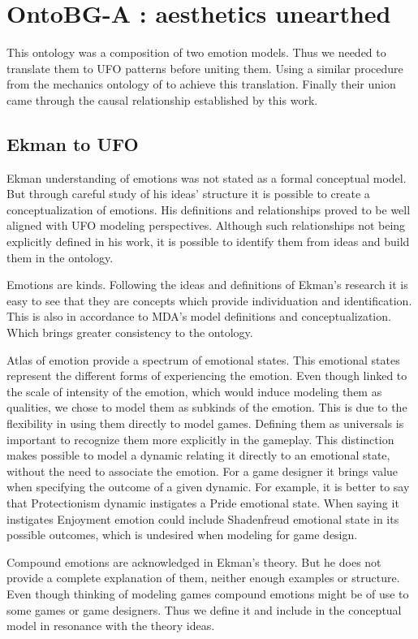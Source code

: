 \section{OntoBG-A : aesthetics unearthed}

This ontology was a composition of two emotion models. Thus we needed to translate them to UFO patterns before uniting them. Using a similar procedure from the mechanics ontology of \cite{kritz_buildingOntology} to achieve this translation. Finally their union came through the causal relationship established by this work.

\subsection{Ekman to UFO}
Ekman understanding of emotions was not stated as a formal conceptual model. But through careful study of his ideas' structure it is possible to create a conceptualization of emotions. His definitions and relationships proved to be well aligned with UFO modeling perspectives. Although such relationships not being explicitly defined in his work, it is possible to identify them from ideas and build them in the ontology.

Emotions are kinds. Following the ideas and definitions of Ekman's research it is easy to see that they are concepts which provide individuation and identification. This is also in accordance to MDA's model definitions and conceptualization. Which brings greater consistency to the ontology.

Atlas of emotion provide a spectrum of emotional states. This emotional states represent the different forms of experiencing the emotion. Even though linked to the scale of intensity of the emotion, which would induce modeling them as qualities, we chose to model them as subkinds of the emotion. This is due to the flexibility in using them directly to model games. Defining them as universals is important to recognize them more explicitly in the gameplay. This distinction makes possible to model a dynamic relating it directly to an emotional state, without the need to associate the emotion. For a game designer it brings value when specifying the outcome of a given dynamic. For example, it is better to say that Protectionism dynamic instigates a Pride emotional state. When saying it instigates Enjoyment emotion could include Shadenfreud emotional state in its possible outcomes, which is undesired when modeling for game design.

Compound emotions are acknowledged in Ekman's theory. But he does not provide a complete explanation of them, neither enough examples or structure. Even though thinking of modeling games compound emotions might be of use to some games or game designers. Thus we define it and include in the conceptual model in resonance with the theory ideas.

